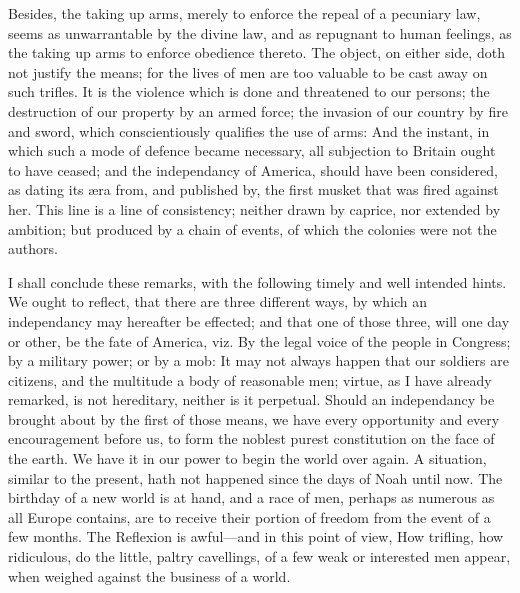 \documentclass[12pt,oneside]{memoir}
\begin{document}
Besides, the taking up arms, merely to enforce the repeal of a
pecuniary law, seems as unwarrantable by the divine law, and as
repugnant to human feelings, as the taking up arms to enforce
obedience thereto. The object, on either side, doth not justify the
means; for the lives of men are too valuable to be cast away on such
trifles. It is the violence which is done and threatened to our
persons; the destruction of our property by an armed force; the
invasion of our country by fire and sword, which conscientiously
qualifies the use of arms: And the instant, in which such a mode of
defence became necessary, all subjection to Britain ought to have
ceased; and the independancy of America, should have been considered,
as dating its æra from, and published by, the first musket that was
fired against her. This line is a line of consistency; neither drawn
by caprice, nor extended by ambition; but produced by a chain of
events, of which the colonies were not the authors.

I shall conclude these remarks, with the following timely and well
intended hints. We ought to reflect, that there are three different
ways, by which an independancy may hereafter be effected; and that
one of those three, will one day or other, be the fate of America,
viz. By the legal voice of the people in Congress; by a military
power; or by a mob: It may not always happen that our soldiers are
citizens, and the multitude a body of reasonable men; virtue, as I
have already remarked, is not hereditary, neither is it perpetual.
Should an independancy be brought about by the first of those means,
we have every opportunity and every encouragement before us, to form
the noblest purest constitution on the face of the earth. We have it
in our power to begin the world over again. A situation, similar to
the present, hath not happened since the days of Noah until now. The
birthday of a new world is at hand, and a race of men, perhaps as
numerous as all Europe contains, are to receive their portion of
freedom from the event of a few months. The Reflexion is awful---and
in this point of view, How trifling, how ridiculous, do the little,
paltry cavellings, of a few weak or interested men appear, when
weighed against the business of a world.
\end{document}
